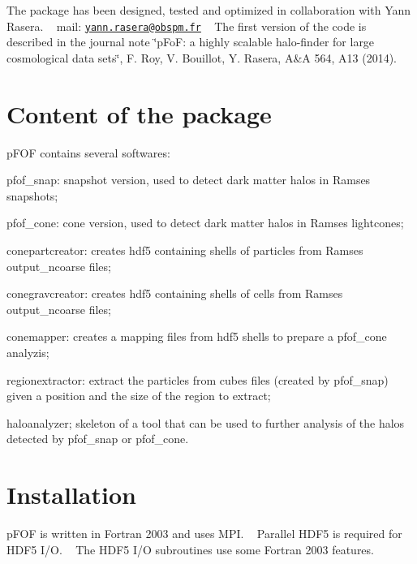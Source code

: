 The package has been designed, tested and optimized in collaboration with Yann Rasera. ~\newline
 mail\+: \href{mailto:yann.rasera@obspm.fr}{\tt yann.\+rasera@obspm.\+fr} ~\newline
 The first version of the code is described in the journal note \char`\"{}p\+Fo\+F\+: a highly scalable halo-\/finder for large cosmological data sets\char`\"{}, F. Roy, V. Bouillot, Y. Rasera, A\&A 564, A13 (2014). ~\newline
\hypertarget{index_content_sec}{}\section{Content of the package}\label{index_content_sec}
p\+F\+OF contains several softwares\+:
\begin{DoxyItemize}
\item pfof\+\_\+snap\+: \textquotesingle{}snapshot\textquotesingle{} version, used to detect dark matter halos in Ramses snapshots;
\item pfof\+\_\+cone\+: \textquotesingle{}cone\textquotesingle{} version, used to detect dark matter halos in Ramses lightcones;
\item conepartcreator\+: creates hdf5 containing shells of particles from Ramses output\+\_\+ncoarse files;
\item conegravcreator\+: creates hdf5 containing shells of cells from Ramses output\+\_\+ncoarse files;
\item conemapper\+: creates a mapping files from hdf5 shells to prepare a pfof\+\_\+cone analyzis;
\item regionextractor\+: extract the particles from cubes files (created by pfof\+\_\+snap) given a position and the size of the region to extract;
\item haloanalyzer; skeleton of a tool that can be used to further analysis of the halos detected by pfof\+\_\+snap or pfof\+\_\+cone.
\end{DoxyItemize}\hypertarget{index_install_sec}{}\section{Installation}\label{index_install_sec}
p\+F\+OF is written in Fortran 2003 and uses M\+PI. ~\newline
 Parallel H\+D\+F5 is required for H\+D\+F5 I/O. ~\newline
 The H\+D\+F5 I/O subroutines use some Fortran 2003 features. ~\newline

